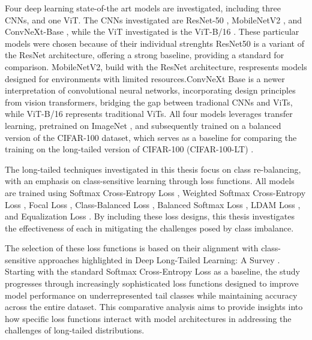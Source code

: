 Four deep learning state-of-the art models are investigated, including three CNNs, and one ViT. The CNNs investigated are ResNet-50 \cite{he2015deepresiduallearningimage}, MobileNetV2 \cite{sandler2018mobilenetv2}, and ConvNeXt-Base \cite{liu2022convnet2020s}, while the ViT investigated is the ViT-B/16 \cite{dosovitskiy2021imageworth16x16words}. These particular models were chosen because of their individual strenghts  ResNet50 is a variant of the ResNet architecture, offering a strong baseline, providing a standard for comparison. MobileNetV2, build with the ResNet architecture, respresents models designed for environments with limited resources.ConvNeXt Base is a newer interpretation of convolutional neural networks, incorporating design principles from vision transformers, bridging the gap between tradional CNNs and ViTs, while ViT-B/16 represents traditional ViTs. All four models leverages transfer learning, pretrained on ImageNet \cite{ImageNet2009}, and subsequently trained on a balanced version of the CIFAR-100 \cite{krizhevsky2009learning} dataset, which serves as a baseline for comparing the training on the long-tailed version of CIFAR-100 (CIFAR-100-LT) \cite{cao2019learningimbalanceddatasetslabeldistributionaware}.  

The long-tailed techniques investigated in this thesis focus on class re-balancing, with an emphasis on class-sensitive learning through loss functions. All models are trained using Softmax Cross-Entropy Loss \cite{cs231n}, Weighted Softmax Cross-Entropy Loss \cite{zhang2023deep}, Focal Loss \cite{lin2018focallossdenseobject}, Class-Balanced Loss \cite{cui2019classbalancedlossbasedeffective}, Balanced Softmax Loss \cite{ren2020balancedmetasoftmaxlongtailedvisual}, LDAM Loss \cite{cao2019learningimbalanceddatasetslabeldistributionaware}, and Equalization Loss \cite{tan2020equalizationlosslongtailedobject}. By including these loss designs, this thesis investigates the effectiveness of each in mitigating the challenges posed by class imbalance.

The selection of these loss functions is based on their alignment with class-sensitive approaches highlighted in Deep Long-Tailed Learning: A Survey \cite{zhang2023deep}. Starting with the standard Softmax Cross-Entropy Loss as a baseline, the study progresses through increasingly sophisticated loss functions designed to improve model performance on underrepresented tail classes while maintaining accuracy across the entire dataset. This comparative analysis aims to provide insights into how specific loss functions interact with model architectures in addressing the challenges of long-tailed distributions. 

